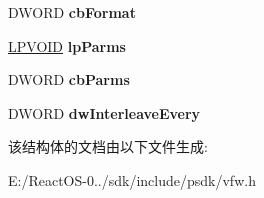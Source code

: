 \begin{DoxyCompactItemize}
\item 
\mbox{\label{struct_a_v_i_c_o_m_p_r_e_s_s_o_p_t_i_o_n_s_a5f3bae9fc35340af490b18eebb59091e}} 
D\+W\+O\+RD {\bfseries cb\+Format}
\item 
\mbox{\label{struct_a_v_i_c_o_m_p_r_e_s_s_o_p_t_i_o_n_s_ad8d53185ca21d99b00145b258ec6bb40}} 
\hyperlink{interfacevoid}{L\+P\+V\+O\+ID} {\bfseries lp\+Parms}
\item 
\mbox{\label{struct_a_v_i_c_o_m_p_r_e_s_s_o_p_t_i_o_n_s_aad3f12033363dff2f8e5bfe37b14cbe7}} 
D\+W\+O\+RD {\bfseries cb\+Parms}
\item 
\mbox{\label{struct_a_v_i_c_o_m_p_r_e_s_s_o_p_t_i_o_n_s_a54944033e901920c844e4b6cea591824}} 
D\+W\+O\+RD {\bfseries dw\+Interleave\+Every}
\end{DoxyCompactItemize}


该结构体的文档由以下文件生成\+:\begin{DoxyCompactItemize}
\item 
E\+:/\+React\+O\+S-\/0../sdk/include/psdk/vfw.\+h\end{DoxyCompactItemize}
